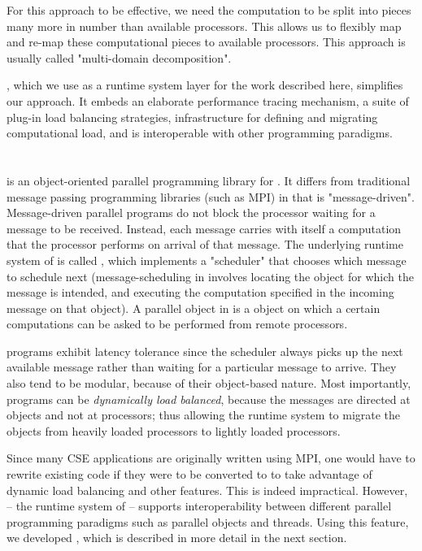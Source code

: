 \documentclass[10pt]{article}
\begin{document}
For this approach to be effective, we need the computation to be split into
pieces many more in number than available processors. This allows us to
flexibly map and re-map these computational pieces to available processors.
This approach is usually called "multi-domain decomposition".

\charmpp{}, which we use as a runtime system layer for the work described here,
simplifies our approach. It embeds an elaborate performance tracing mechanism,
a suite of plug-in load balancing strategies, infrastructure for defining and
migrating computational load, and is interoperable with other programming
paradigms.


\section{\charmpp{}}

\charmpp{} is an object-oriented parallel programming library for \CC{}.  It
differs from traditional message passing programming libraries (such as MPI) in
that \charmpp{} is "message-driven". Message-driven parallel programs do not
block the processor waiting for a message to be received.  Instead, each
message carries with itself a computation that the processor performs on
arrival of that message. The underlying runtime system of \charmpp{} is called
\converse{}, which implements a "scheduler" that chooses which message to
schedule next (message-scheduling in \charmpp{} involves locating the object
for which the message is intended, and executing the computation specified in
the incoming message on that object). A parallel object in \charmpp{} is a
\CC{} object on which a certain computations can be asked to be performed from
remote processors.

\charmpp{} programs exhibit latency tolerance since the scheduler always picks
up the next available message rather than waiting for a particular message to
arrive.  They also tend to be modular, because of their object-based nature.
Most importantly, \charmpp{} programs can be \emph{dynamically load balanced},
because the messages are directed at objects and not at processors; thus
allowing the runtime system to migrate the objects from heavily loaded
processors to lightly loaded processors.

Since many CSE applications are originally written using MPI, one would have to
rewrite existing code if they were to be converted to \charmpp{} to take
advantage of dynamic load balancing and other \charmpp{} features. This is
indeed impractical. However, \converse{} -- the runtime system of \charmpp{} --
supports interoperability between different parallel programming paradigms
such as parallel objects and threads. Using this feature, we developed
\ampi{}, which is described in more detail in the next section.
\end{document}
